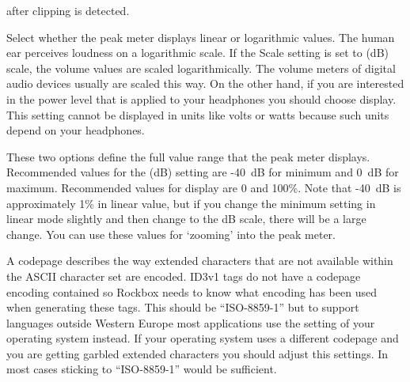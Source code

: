 \begin{description}
{\begin{description}
        after clipping is detected.
      \item[\label{ref:Peakmetersetting}Scale.]
        Select whether the peak meter displays linear or logarithmic values.
        The human ear perceives loudness on a logarithmic scale. If the Scale
        setting is set to  (dB) scale, the volume values
        are scaled logarithmically. The volume meters of digital audio
        devices usually are scaled this way. On the other hand, if you
        are interested in the power level that is applied to your headphones
        you should choose  display. This setting cannot be
        displayed in units like volts or watts because such units depend
        on your headphones.
      \item[Minimum and maximum range.]
        These two options define the full value range that the peak meter
        displays. Recommended values for the  (dB) setting
        are {}-40~dB for minimum and 0~dB for maximum. Recommended values
        for  display are 0 and 100\%. Note that {}-40~dB is
        approximately 1\% in linear value, but if you change the minimum
        setting in linear mode slightly and then change to the dB scale,
        there will be a large change. You can use these values for `zooming'
        into the peak meter.
      \end{description}
    }
    \item[\label{ref:Defaultcodepage}Default Codepage.]
      A codepage describes the way extended characters that are not available
      within the ASCII character set are encoded. ID3v1 tags do not have a
      codepage encoding contained so Rockbox needs to know what encoding has
      been used when generating these tags. This should be ``ISO-8859-1'' but
      to support languages outside Western Europe most applications use
      the setting of your operating system instead. If your operating system
      uses a different codepage and you are getting garbled extended characters
      you should adjust this settings. In most cases sticking to
      ``ISO-8859-1'' would be sufficient.
  \end{description}
